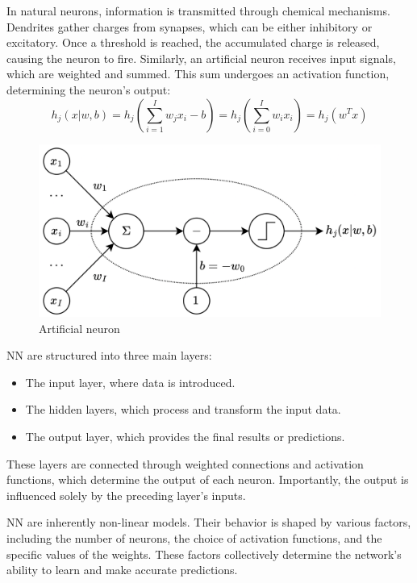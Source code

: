 In natural neurons, information is transmitted through chemical mechanisms. 
Dendrites gather charges from synapses, which can be either inhibitory or excitatory. 
Once a threshold is reached, the accumulated charge is released, causing the neuron to fire. 
Similarly, an artificial neuron receives input signals, which are weighted and summed. 
This sum undergoes an activation function, determining the neuron's output:
\[h_j(x|w,b)=h_j\left(\sum_{i=1}^{I}w_j x_i-b\right)=h_j\left( \sum_{i=0}^{I}w_i x_i \right)=h_j\left(w^T x\right)\]
\begin{figure}[H]
    \centering
    \includegraphics[width=0.5\linewidth]{images/neuron.png}
    \caption{Artificial neuron}
\end{figure}
NN are structured into three main layers:
\begin{itemize}
    \item The input layer, where data is introduced.
    \item The hidden layers, which process and transform the input data.
    \item The output layer, which provides the final results or predictions.
\end{itemize}
These layers are connected through weighted connections and activation functions, which determine the output of each neuron. 
Importantly, the output is influenced solely by the preceding layer's inputs.

NN are inherently non-linear models. 
Their behavior is shaped by various factors, including the number of neurons, the choice of activation functions, and the specific values of the weights.
These factors collectively determine the network's ability to learn and make accurate predictions.

